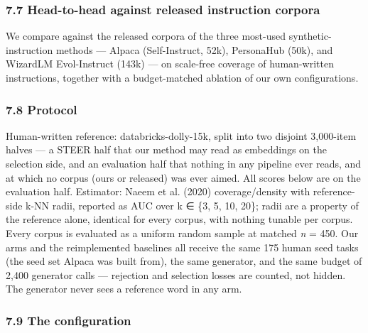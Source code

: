 \documentclass[
  10pt,
]{article}
\theoremstyle{plain}
\theoremstyle{definition}
\begin{document}
\subsubsection{7.7 Head-to-head against released instruction
corpora}\label{77-head-to-head-against-released-instruction-corpora}

We compare against the released corpora of the three most-used
synthetic-instruction methods --- Alpaca (Self-Instruct, 52k),
PersonaHub (50k), and WizardLM Evol-Instruct (143k) --- on scale-free
coverage of human-written instructions, together with a budget-matched
ablation of our own configurations.

\subsubsection{7.8 Protocol}\label{78-protocol}

Human-written reference: databricks-dolly-15k, split into two disjoint
3,000-item halves --- a STEER half that our method may read as
embeddings on the selection side, and an evaluation half that nothing in
any pipeline ever reads, and at which no corpus (ours or released) was
ever aimed. All scores below are on the evaluation half. Estimator:
Naeem et al. (2020) coverage/density with reference-side k-NN radii,
reported as AUC over k ∈ \{3, 5, 10, 20\}; radii are a property of the
reference alone, identical for every corpus, with nothing tunable per
corpus. Every corpus is evaluated as a uniform random sample at matched
\emph{n} = 450. Our arms and the reimplemented baselines all receive the
same 175 human seed tasks (the seed set Alpaca was built from), the same
generator, and the same budget of 2,400 generator calls --- rejection
and selection losses are counted, not hidden. The generator never sees a
reference word in any arm.

\subsubsection{7.9 The configuration}\label{79-the-configuration}
\end{document}
